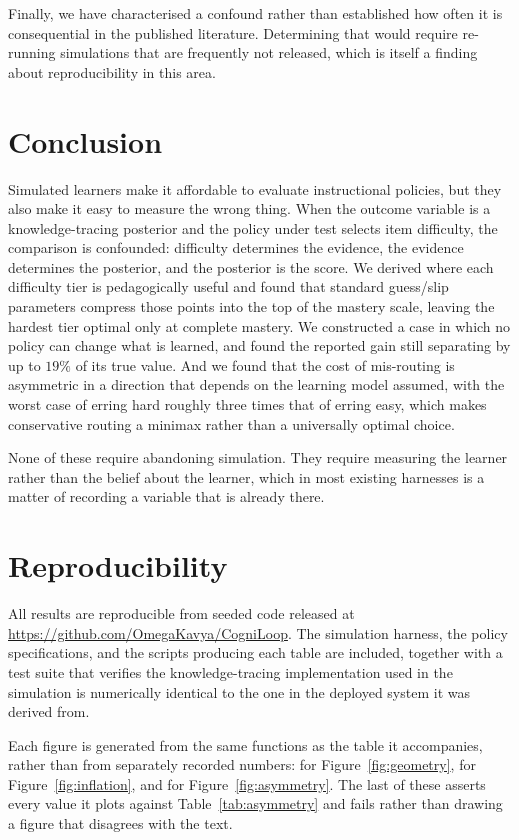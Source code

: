 \documentclass[notitlepage,12pt]{jedm}
\begin{document}
Finally, we have characterised a confound rather than established how often it is consequential in the published literature. Determining that would require re-running simulations that are frequently not released, which is itself a finding about reproducibility in this area.

\section{Conclusion}

Simulated learners make it affordable to evaluate instructional policies, but they also make it easy to measure the wrong thing. When the outcome variable is a knowledge-tracing posterior and the policy under test selects item difficulty, the comparison is confounded: difficulty determines the evidence, the evidence determines the posterior, and the posterior is the score. We derived where each difficulty tier is pedagogically useful and found that standard guess/slip parameters compress those points into the top of the mastery scale, leaving the hardest tier optimal only at complete mastery. We constructed a case in which no policy can change what is learned, and found the reported gain still separating by up to $19\%$ of its true value. And we found that the cost of mis-routing is asymmetric in a direction that depends on the learning model assumed, with the worst case of erring hard roughly three times that of erring easy, which makes conservative routing a minimax rather than a universally optimal choice.

None of these require abandoning simulation. They require measuring the learner rather than the belief about the learner, which in most existing harnesses is a matter of recording a variable that is already there.

\section*{Reproducibility}

All results are reproducible from seeded code released at \url{https://github.com/OmegaKavya/CogniLoop}. The simulation harness, the policy specifications, and the scripts producing each table are included, together with a test suite that verifies the knowledge-tracing implementation used in the simulation is numerically identical to the one in the deployed system it was derived from.

Each figure is generated from the same functions as the table it accompanies, rather than from separately recorded numbers:  for Figure~\ref{fig:geometry},  for Figure~\ref{fig:inflation}, and  for Figure~\ref{fig:asymmetry}. The last of these asserts every value it plots against Table~\ref{tab:asymmetry} and fails rather than drawing a figure that disagrees with the text.



\end{document}
